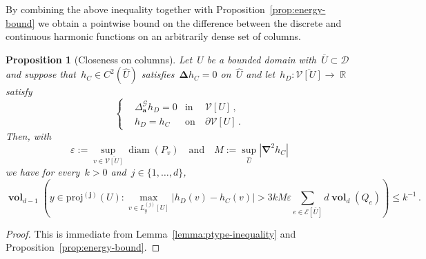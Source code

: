 \documentclass[12pt]{amsart}
\numberwithin{equation}{section}
\DeclareMathOperator{\R}{\mathbb{R}}
\DeclareMathOperator{\diam}{{\mathop{diam}}}
\newtheorem{prop}[theorem]{Proposition}
\newtheorem{lemma}[theorem]{Lemma}
\newcommand*{\Rd}{\ensuremath{\mathbb{R}^d}}
\newcommand{\V}{\mathcal{V}}
\newcommand{\E}{\mathcal{E}}
\newcommand{\eps}{\varepsilon}
\newcommand{\CLap}{\boldsymbol{\Delta}}
\newcommand{\Cnabla}{\boldsymbol{\nabla}}
\newcommand{\proj}{\boldsymbol{\mathrm{proj}}}
\newcommand{\projj}{\boldsymbol{\mathrm{proj}^{(j)}}}
\newcommand{\aDelta}{\hyperref[eq:geometric-laplacian]{{\Delta^{\mathcal{G}}_{\cond}}}}
\newcommand{\cond}{\hyperref[eq:geometric-laplacian]{\mathbf{a}}}
\newcommand{\GCU}{\hyperref[eq:graph-closure]{\widehat{U}}}
\newcommand{\Qe}{\hyperref[eq:qeset]{Q_e}}
\newcommand{\Lyj}{\hyperref[eq:line-project]{L_y^{(j)}}}
\DeclareMathOperator{\vol}{\mathbf{vol}}
\begin{document}
By combining the above inequality together with Proposition~\ref{prop:energy-bound} we obtain a pointwise bound on the 
difference between the discrete and continuous harmonic functions on an arbitrarily dense set of columns. 
\begin{prop}[Closeness on columns]
	\label{prop:energy-poincare-bound}
	Let~$U$ be a bounded domain with~$\overline{U} \subset \mathcal{D}$ and suppose that~$h_C \in C^{2}(\GCU)$ satisfies~$\CLap h_C = 0$ on~$\GCU$ and let~$h_D: \overline{\V[U]} \to \R$ satisfy 
	\[
	\left\{
	\begin{aligned}
		&  \aDelta h_D = 0 & \mbox{in} & \ \V[U] \,,
		\\
		& h_D = h_C & \mbox{on} & \  \partial \V[U] \, . 
	\end{aligned}
	\right.
	\]
	Then, with
	\[
	\eps := \sup_{v \in \overline{\V[U]}} \diam(P_v)
	\quad \mbox{and} \quad M := \sup_{\GCU} |\Cnabla^2 h_C|
	\]
	we have for every~$k > 0$ and~$j \in \{1, \ldots, d\}$,
	\[
	\vol_{d-1} \left( y \in \projj(U): \max_{v \in \Lyj[U]} |h_D(v) - h_C(v)| > 3 k M \eps \sum_{e \in \E[\overline{U}]} d   \vol_{d}(\Qe)  \right) \leq k^{-1}  \, . 
	\]
\end{prop}
\begin{proof}
	This is immediate from Lemma~\ref{lemma:ptype-inequality} and Proposition~\ref{prop:energy-bound}. 
\end{proof}

%
\end{document}
